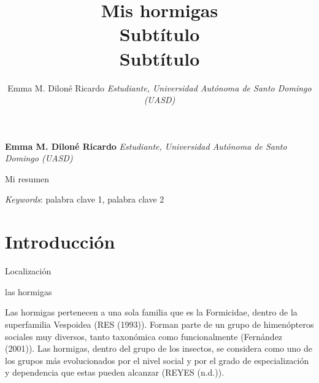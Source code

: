 \documentclass[11pt,]{article}
\title{Mis hormigas\\
Subtítulo\\
Subtítulo  }
\author{\Large Emma M. Diloné Ricardo\vspace{0.05in} \newline\normalsize\emph{Estudiante, Universidad Autónoma de Santo Domingo (UASD)}  }
\date{}
\newcommand*{\authorfont}{\fontfamily{phv}\selectfont}
\renewenvironment{abstract}
 {{%
    \setlength{\leftmargin}{0mm}
    \setlength{\rightmargin}{\leftmargin}%
  }%
  \relax}
 {\endlist}
\begin{document}
	
%

{%
\setlength{\parindent}{0pt}
\thispagestyle{plain}
{\fontsize{18}{20}\selectfont\raggedright 
\maketitle  %

}

{
   \vskip 13.5pt\relax \normalsize\fontsize{11}{12} 
\textbf{\authorfont Emma M. Diloné Ricardo} \hskip 15pt \emph{\small Estudiante, Universidad Autónoma de Santo Domingo (UASD)}   

}

}








\begin{abstract}

    \hbox{\vrule height .2pt width 39.14pc}

    \vskip 8.5pt %

\noindent Mi resumen


\vskip 8.5pt \noindent \emph{Keywords}: palabra clave 1, palabra clave 2 \par

    \hbox{\vrule height .2pt width 39.14pc}



\end{abstract}


\vskip 6.5pt


\noindent  \section{Introducción}\label{introducciuxf3n}

Localización

las hormigas

Las hormigas pertenecen a una sola familia que es la Formicidae, dentro
de la superfamilia Vespoidea (RES (1993)). Forman parte de un grupo de
himenópteros sociales muy diversos, tanto taxonómica como funcionalmente
(Fernández (2001)). Las hormigas, dentro del grupo de los insectos, se
considera como uno de los grupos más evolucionados por el nivel social y
por el grado de especialización y dependencia que estas pueden alcanzar
(REYES (n.d.)).
\end{document}
